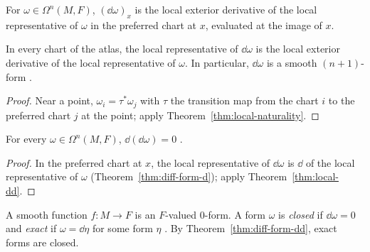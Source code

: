 \begin{definition}
  \label{def:diff-form-d}
  \leanok
  For $\omega \in \Omega^n(M, F)$, $(\dd\omega)_x$ is the local exterior derivative of the local
  representative of $\omega$ in the preferred chart at $x$, evaluated at the image of $x$.
\end{definition}

\begin{theorem}
  \label{thm:diff-form-d}
  \leanok
  In every chart of the atlas, the local representative of $\dd\omega$ is the local exterior
  derivative of the local representative of $\omega$. In particular, $\dd\omega$ is a smooth
  $(n+1)$-form \cite[Proposition~3.6.7]{GN26}.
\end{theorem}

\begin{proof}
  \leanok
  Near a point, $\omega_i = \tau^*\omega_j$ with $\tau$ the transition map from the chart $i$ to
  the preferred chart $j$ at the point; apply Theorem~\ref{thm:local-naturality}.
\end{proof}

\begin{theorem}[$\dd \circ \dd = 0$]
  \label{thm:diff-form-dd}
  \leanok
  For every $\omega \in \Omega^n(M, F)$, $\dd(\dd\omega) = 0$ \cite[Proposition~3.6.9]{GN26}.
\end{theorem}

\begin{proof}
  \leanok
  In the preferred chart at $x$, the local representative of $\dd\omega$ is $\dd$ of the local
  representative of $\omega$ (Theorem~\ref{thm:diff-form-d}); apply
  Theorem~\ref{thm:local-dd}.
\end{proof}

\begin{definition}
  \label{def:closed-exact}
  \leanok
  A smooth function $f \colon M \to F$ is an $F$-valued $0$-form. A form $\omega$ is
  \emph{closed} if $\dd\omega = 0$ and \emph{exact} if $\omega = \dd\eta$ for some form $\eta$
  \cite[Definition~3.6.11]{GN26}. By Theorem~\ref{thm:diff-form-dd}, exact forms are closed.
\end{definition}

